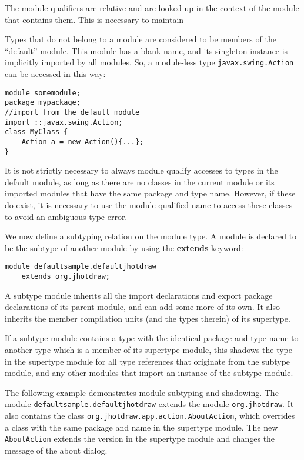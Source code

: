 The module qualifiers are relative and are looked up in the context 
of the module that contains them. This is necessary to maintain

Types that do not belong to a module are considered to be members of
the ``default'' module. This module has a blank name, and its singleton
instance is implicitly imported by all modules. So, a module-less
type {\tt javax.swing.Action} can be accessed in this way:

\begin{lstlisting}[caption=Default Module Lookups]
module somemodule;
package mypackage;
//import from the default module
import ::javax.swing.Action;
class MyClass {
	Action a = new Action(){...};
}
\end{lstlisting}

It is not strictly necessary to always module qualify accesses to types in
the default module, as long as there are no classes in the current module
or its imported modules that have the same package and type name. However,
if these do exist, it is necessary to use the module qualified name to access
these classes to avoid an ambiguous type error.


We now define a subtyping relation on the module type. A module is declared
to be the subtype of another module by using the \textbf{extends} keyword:

\begin{lstlisting}
module defaultsample.defaultjhotdraw 
	extends org.jhotdraw;
\end{lstlisting}

A subtype module inherits all the import declarations and export package declarations 
of its parent module, and can add some more of its own. It also inherits the member 
compilation units (and the types therein) of its supertype.

If a subtype module contains a type with the identical package and type name
to another type which is a member of its supertype module, 
this shadows the type in the supertype module for all type references that
originate from the subtype module, and any other modules that import an
instance of the subtype module.

The following example demonstrates module subtyping and shadowing. The module
\texttt{defaultsample.defaultjhotdraw} extends the module \texttt{org.jhotdraw}. 
It also contains the class \texttt{org.jhotdraw.app.action.AboutAction},
which overrides a class with the same package and name in the supertype module.
The new \texttt{AboutAction} extends the version in the supertype module and
changes the message of the about dialog.

